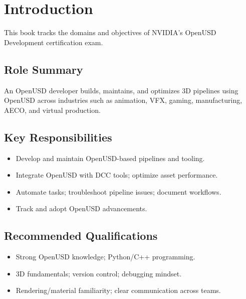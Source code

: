 \chapter{Introduction}
This book tracks the domains and objectives of NVIDIA’s OpenUSD Development certification exam.

\section{Role Summary}
An OpenUSD developer builds, maintains, and optimizes 3D pipelines using OpenUSD across industries such as animation, VFX, gaming, manufacturing, AECO, and virtual production.

\section{Key Responsibilities}
\begin{itemize}[leftmargin=*]
  \item Develop and maintain OpenUSD-based pipelines and tooling.
  \item Integrate OpenUSD with DCC tools; optimize asset performance.
  \item Automate tasks; troubleshoot pipeline issues; document workflows.
  \item Track and adopt OpenUSD advancements.
\end{itemize}

\section{Recommended Qualifications}
\begin{itemize}[leftmargin=*]
  \item Strong OpenUSD knowledge; Python/C++ programming.
  \item 3D fundamentals; version control; debugging mindset.
  \item Rendering/material familiarity; clear communication across teams.
\end{itemize}
